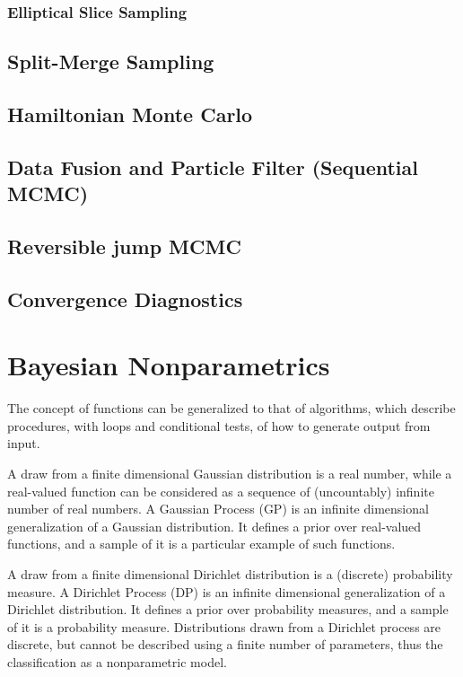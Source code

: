 \documentclass{book}
\begin{document}
\subsection{Elliptical Slice Sampling}

\section{Split-Merge Sampling}

\section{Hamiltonian Monte Carlo}

\section{Data Fusion and Particle Filter (Sequential MCMC)}
\section{Reversible jump MCMC}
\section{Convergence Diagnostics}



\chapter{Bayesian Nonparametrics}
The concept of functions can be generalized to that of algorithms, which describe procedures, with loops and conditional tests, of how to generate output from input.

A draw from a finite dimensional Gaussian distribution is a real number, while a real-valued function can be considered as a sequence of (uncountably) infinite number of real numbers. A Gaussian Process (GP) is an infinite dimensional generalization of a Gaussian distribution. It defines a prior over real-valued functions, and a sample of it is a particular example of such functions.

A draw from a finite dimensional Dirichlet distribution is a (discrete) probability measure. A Dirichlet Process (DP) is an infinite dimensional generalization of a Dirichlet distribution. It defines a prior over probability measures, and a sample of it is a probability measure.  Distributions drawn from a Dirichlet process are discrete, but cannot be described using a finite number of parameters, thus the classification as a nonparametric model.
\end{document}
